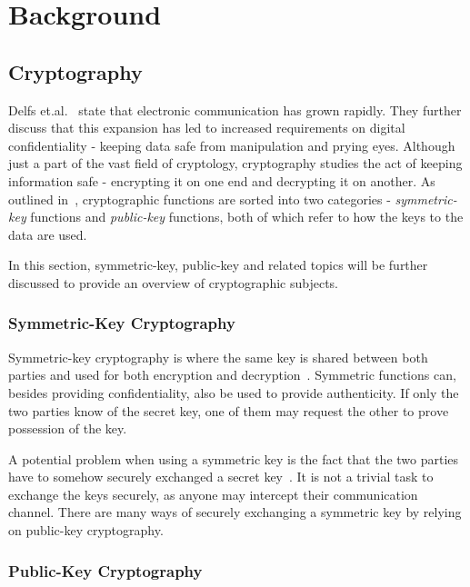 \chapter{Background}
\label{chapter:background}

\section{Cryptography}

Delfs et.al.~\cite{delfs2007} state that electronic communication has grown rapidly. They further discuss that this expansion has led to increased requirements on digital confidentiality - keeping data safe from manipulation and prying eyes. Although just a part of the vast field of cryptology, cryptography studies the act of keeping information safe - encrypting it on one end and decrypting it on another. As outlined in~\cite{bernstein2017}, cryptographic functions are sorted into two categories - \textit{symmetric-key} functions and \textit{public-key} functions, both of which refer to how the keys to the data are used.

In this section, symmetric-key, public-key and related topics will be further discussed to provide an overview of cryptographic subjects.

\subsection{Symmetric-Key Cryptography}

Symmetric-key cryptography is where the same key is shared between both parties and used for both encryption and decryption~\cite{bernstein2017}. Symmetric functions can, besides providing confidentiality, also be used to provide authenticity. If only the two parties know of the secret key, one of them may request the other to prove possession of the key.

A potential problem when using a symmetric key is the fact that the two parties have to somehow securely exchanged a secret key~\cite{delfs2007}. It is not a trivial task to exchange the keys securely, as anyone may intercept their communication channel. There are many ways of securely exchanging a symmetric key by relying on public-key cryptography.

\subsection{Public-Key Cryptography}
\label{section:background:public-key-cryptography}


